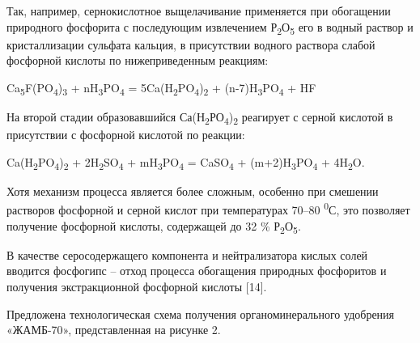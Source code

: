 \begin{multicols}{2}
Так, например, сернокислотное выщелачивание применяется при обогащении
природного фосфорита с последующим извлечением
Р\textsubscript{2}О\textsubscript{5} его в водный раствор и
кристаллизации сульфата кальция, в присутствии водного раствора слабой
фосфорной кислоты по нижеприведенным реакциям:

Ca\textsubscript{5}F(PO\textsubscript{4})\textsubscript{3} +
nH\textsubscript{3}PO\textsubscript{4} =
5Ca(H\textsubscript{2}PO\textsubscript{4})\textsubscript{2} +
(n-7)H\textsubscript{3}PO\textsubscript{4} + HF

На второй стадии образовавшийся
Са(Н\textsubscript{2}РО\textsubscript{4})\textsubscript{2} реагирует с
серной кислотой в присутствии с фосфорной кислотой по реакции:

Ca(H\textsubscript{2}PO\textsubscript{4})\textsubscript{2} +
2H\textsubscript{2}SO\textsubscript{4} +
mH\textsubscript{3}PO\textsubscript{4} = CaSO\textsubscript{4} +
(m+2)H\textsubscript{3}PO\textsubscript{4} + 4H\textsubscript{2}O.

Хотя механизм процесса является более сложным, особенно при смешении
растворов фосфорной и серной кислот при температурах 70--80
\textsuperscript{0}С, это позволяет получение фосфорной кислоты,
содержащей до 32 \% Р\textsubscript{2}О\textsubscript{5}.

В качестве серосодержащего компонента и нейтрализатора кислых солей
вводится фосфогипс -- отход процесса обогащения природных фосфоритов и
получения экстракционной фосфорной кислоты {[}14{]}.

Предложена технологическая схема получения органоминерального удобрения
«ЖАМБ-70», представленная на рисунке 2.
\end{multicols}

